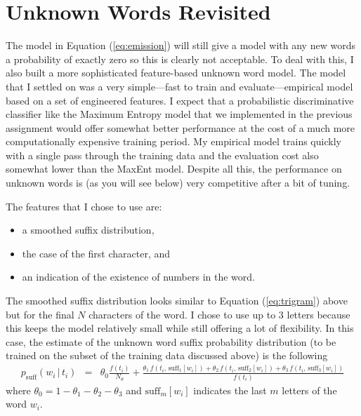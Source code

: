 \documentclass[11pt]{article}
\newcommand{\eq}[1]{Equation (\ref{eq:#1})}
\newcommand{\eqlabel}[1]{\label{eq:#1}}
\begin{document}
\section{Unknown Words Revisited}

The model in \eq{emission} will still give a model with any new words a
probability of exactly zero so this is clearly not acceptable.
To deal with this, I also built a more sophisticated feature-based unknown
word model.
The model that I settled on was a very simple---fast to train and
evaluate---empirical model based on a set of engineered features.
I expect that a probabilistic discriminative classifier like the Maximum
Entropy model that we implemented in the previous assignment would offer
somewhat better performance at the cost of a much more computationally
expensive training period.
My empirical model trains quickly with a single pass through the training data
and the evaluation cost also somewhat lower than the MaxEnt model.
Despite all this, the performance on unknown words is (as you will see below)
very competitive after a bit of tuning.

The features that I chose to use are:
\begin{itemize}
\item{a smoothed suffix distribution,}
\item{the case of the first character, and}
\item{an indication of the existence of numbers in the word.}
\end{itemize}

The smoothed suffix distribution looks similar to \eq{trigram} above but for
the final $N$ characters of the word.
I chose to use up to 3 letters because this keeps the model relatively small
while still offering a lot of flexibility.
In this case, the estimate of the unknown word suffix probability
distribution (to be trained on the subset of the training data discussed
above) is the following
\begin{eqnarray}\eqlabel{psuff}
p_\mathrm{suff}(w_i\,|\,t_i) &=& \theta_0\frac{f(t_i)}{N_\theta} +
    \frac{\theta_1\,f(t_i,\,\mathrm{suff}_1[w_i])
          + \theta_2\,f(t_i,\,\mathrm{suff}_2[w_i])
          + \theta_3\,f(t_i,\,\mathrm{suff}_3[w_i])}{f(t_i)}
\end{eqnarray}
where $\theta_0 = 1 - \theta_1 - \theta_2 - \theta_3$ and
$\mathrm{suff}_m[w_i]$ indicates the last $m$ letters of the word $w_i$.
\end{document}
